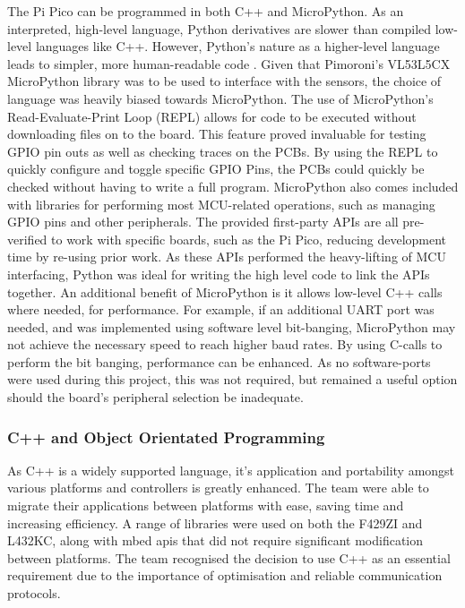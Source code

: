 \documentclass [12pt]{article}
\begin{document}
The Pi Pico can be programmed in both C++ and MicroPython. As an interpreted, high-level language, Python derivatives are slower than compiled low-level languages like C++. However, Python’s nature as a higher-level language leads to simpler, more human-readable code \cite{readablecode}. Given that Pimoroni’s VL53L5CX MicroPython library was to be used to interface with the sensors, the choice of language was heavily biased towards MicroPython.
The use of MicroPython’s Read-Evaluate-Print Loop (REPL) allows for code to be executed without downloading files on to the board. This feature proved invaluable for testing GPIO pin outs as well as checking traces on the PCBs. By using the REPL to quickly configure and toggle specific GPIO Pins, the PCBs could quickly be checked without having to write a full program.
MicroPython also comes included with libraries for performing most MCU-related operations, such as managing GPIO pins and other peripherals. The provided first-party APIs are all pre-verified to work with specific boards, such as the Pi Pico, reducing development time by re-using prior work. As these APIs performed the heavy-lifting of MCU interfacing, Python was ideal for writing the high level code to link the APIs together.
An additional benefit of MicroPython is it allows low-level C++ calls where needed, for performance. For example, if an additional UART port was needed, and was implemented using software level bit-banging, MicroPython may not achieve the necessary speed to reach higher baud rates. By using C-calls to perform the bit banging, performance can be enhanced. As no software-ports were used during this project, this was not required, but remained a useful option should the board’s peripheral selection be inadequate.


\subsubsection{C++ and Object Orientated Programming}
As C++ is a widely supported language, it’s application and portability amongst various platforms and controllers is greatly enhanced. The team were able to migrate their applications between platforms with ease, saving time and increasing efficiency. A range of libraries were used on both the F429ZI and L432KC, along with mbed \gls{api}s that did not require significant modification between platforms. The team recognised the decision to use C++ as an essential requirement due to the importance of optimisation and reliable communication protocols.
\end{document}
